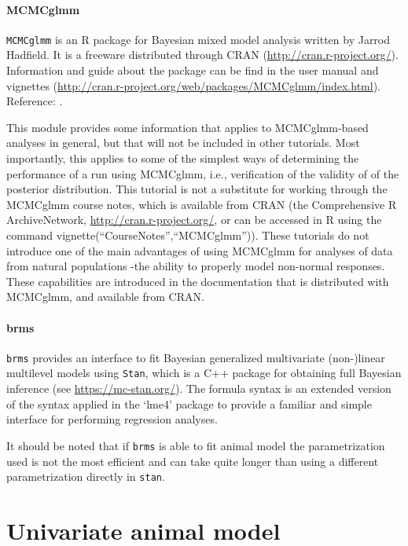 \documentclass[
  12pt,
]{book}
\begin{document}
\hypertarget{mcmcglmm}{%
\subsubsection{MCMCglmm}\label{mcmcglmm}}

\texttt{MCMCglmm} is an R package for Bayesian mixed model analysis written by Jarrod Hadfield. It is a freeware distributed through CRAN (\url{http://cran.r-project.org/}). Information and guide about the package can be find in the user manual and vignettes (\url{http://cran.r-project.org/web/packages/MCMCglmm/index.html}).
Reference: \citep[\citet{R-MCMCglmm}]{MCMCglmm2010}.

This module provides some information that applies to MCMCglmm-based analyses in general, but that will not be included in other tutorials.
Most importantly, this applies to some of the simplest ways of determining the performance of a run using MCMCglmm, i.e., verification of the validity of of the posterior distribution.
This tutorial is not a substitute for working through the MCMCglmm course notes, which is available from CRAN (the Comprehensive R ArchiveNetwork, \url{http://cran.r-project.org/}, or can be accessed in R using the command vignette(``CourseNotes'',``MCMCglmm'')).
These tutorials do not introduce one of the main advantages of using MCMCglmm for analyses of data from natural populations -the ability to properly model non-normal responses.
These capabilities are introduced in the documentation that is distributed with MCMCglmm, and available from CRAN.

\hypertarget{brms}{%
\subsubsection{brms}\label{brms}}

\texttt{brms} provides an interface to fit Bayesian generalized multivariate (non-)linear multilevel models using \texttt{Stan}, which is a C++ package for obtaining full Bayesian inference (see \url{https://mc-stan.org/}).
The formula syntax is an extended version of the syntax applied in the `lme4' package to provide a familiar and simple interface for performing regression analyses.

It should be noted that if \texttt{brms} is able to fit animal model the parametrization used is not the most efficient and can take quite longer than using a different parametrization directly in \texttt{stan}.

\hypertarget{univariate-animal-model}{%
\chapter{Univariate animal model}\label{univariate-animal-model}}
\end{document}
